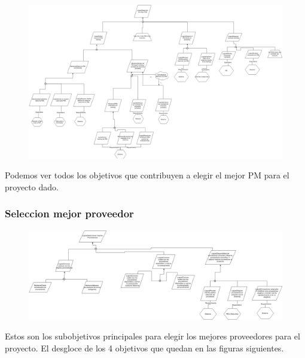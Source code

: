 \begin{figure}[H]
    \centering
    \includegraphics[width=9.5in, keepaspectratio, angle=90]{imagenes/objetivos-seleccion-mejor-pm.png}
\end{figure}

Podemos ver todos los objetivos que contribuyen a elegir el mejor PM para el proyecto dado.

\subsubsection{Seleccion mejor proveedor}

\begin{figure}[H]
    \centering
    \includegraphics[width=9in, keepaspectratio, angle=90]{imagenes/objetivos-seleccion-mejor-proveedor-principal.png}
\end{figure}

Estos son los subobjetivos principales para elegir los mejores proveedores para el proyecto. El desgloce de los 4 objetivos que quedan en las figuras siguientes.

